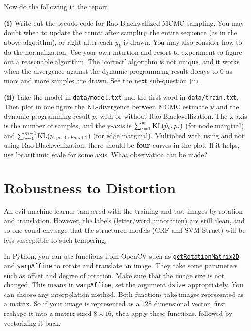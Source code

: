 \documentclass[11pt]{report}
\begin{document}
\begin{itemize}
		Now do the following in the report.
		
		\textbf{(i)}  Write out the pseudo-code for Rao-Blackwellized MCMC sampling.  
		You may doubt when to update the count:
		after sampling the entire sequence (as in the above algorithm),
		or right after each $y_k$ is drawn.
		You may also consider how to do the normalization.
		Use your own intuition and resort to experiment to figure out a reasonable algorithm.
		The `correct' algorithm is not unique, and it works when the divergence against the dynamic programming result decays to 0 as more and more samples are drawn.
		See the next sub-question (ii).
		
		\textbf{(ii)} Take the model in \verb#data/model.txt# and the first word in \verb#data/train.txt#. Then plot in one figure the KL-divergence between MCMC estimate $\tilde{p}$ and the dynamic programming result $p$, with or without Rao-Blackwellization.
		The x-axis is the number of samples,
		and the y-axis is 
		$\sum_{s=1}^m \text{KL}(\tilde{p}_s, p_s)$ (for node marginal) and 
		$\sum_{s=1}^{m-1} \text{KL}(\tilde{p}_{s,s+1}, p_{s,s+1})$ (for edge marginal).
		Multiplied with using and not using Rao-Blackwellization,
		there should be \textbf{four} curves in the plot.
		If it helps, use logarithmic scale for some axis.
		What observation can be made?
	\end{itemize}
	
	
	
	
	\section{Robustness to Distortion}
	
	An evil machine learner tampered with the training and test images by rotation and translation.
	However, the labels (letter/word annotation) are still clean, and so
	one could envisage that the structured models (CRF and SVM-Struct) will be less susceptible to such tempering.
	
	
	
	In Python, you can use functions from OpenCV such as
	\href{https://docs.opencv.org/3.4/da/d54/group__imgproc__transform.html#gafbbc470ce83812914a70abfb604f4326}{\texttt{getRotationMatrix2D}} and \href{https://docs.opencv.org/3.4/da/d54/group__imgproc__transform.html#ga0203d9ee5fcd28d40dbc4a1ea4451983}{\texttt{warpAffine}} to rotate and translate an image. 
	They take some parameters such as offset and degree of rotation.
	Make sure that the image size is not changed. 
	This means in \texttt{warpAffine}, set the argument \verb#dsize# appropriately.
	You can choose any interpolation method.
	Both functions take images represented as a matrix.
	So if your image is represented as a 128 dimensional vector,
	first reshape it into a matrix sized $8 \times 16$,
	then apply these functions,
	followed by vectorizing it back.
	
\end{document}
